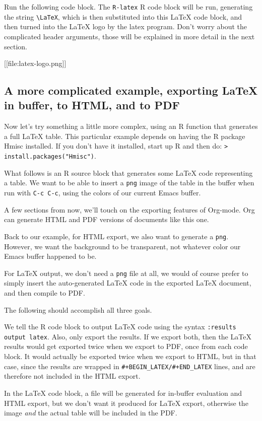 \documentclass[11pt]{article}
\begin{document}
Run the following code block. The \texttt{R-latex} R code block will be run, generating the string \texttt{\textbackslash{}LaTeX}, which is then substituted into this \LaTeX{} code block, and then turned into the \LaTeX{} logo by the latex program. Don't worry about the complicated header arguments, those will be explained in more detail in the next section. 

[[file:latex-logo.png]]
\subsection*{A more complicated example, exporting \LaTeX{} in buffer, to HTML, and to PDF}
\label{sec-6-2}

Now let's try something a little more complex, using an R function
that generates a full \LaTeX{} table. This particular example depends on
having the R package Hmisc installed. If you don't have it installed,
start up R and then do: \texttt{> install.packages("Hmisc")}.

What follows is an R source block that generates some \LaTeX{} code
representing a table.  We want to be able to insert a \texttt{png} image of
the table in the buffer when run with \texttt{C-c C-c}, using the colors of
our current Emacs buffer.

A few sections from now, we'll touch on the exporting features of
Org-mode.  Org can generate HTML and PDF versions of documents like
this one.

Back to our example, for HTML export, we also want to generate a
\texttt{png}. However, we want the background to be transparent, not whatever
color our Emacs buffer happened to be.

For \LaTeX{} output, we don't need a \texttt{png} file at all, we would of
course prefer to simply insert the auto-generated \LaTeX{} code in the
exported \LaTeX{} document, and then compile to PDF.

The following should accomplish all three goals.  

We tell the R code block to output \LaTeX{} code using the syntax
\texttt{:results output latex}.  Also, only export the results.  If we export
both, then the \LaTeX{} results would get exported twice when we export
to PDF, once from each code block.  It would actually be exported
twice when we export to HTML, but in that case, since the results are
wrapped in \texttt{\#+BEGIN\_LATEX/\#+END\_LATEX} lines, and are therefore not
included in the HTML export.

In the \LaTeX{} code block, a file will be generated for in-buffer
evaluation and HTML export, but we don't want it produced for \LaTeX{}
export, otherwise the image \emph{and} the actual table will be included in
the PDF.
\end{document}
